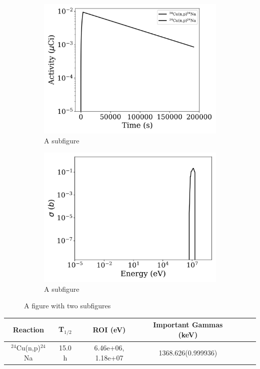 \begin{figure}[h]
\centering
\begin{subfigure}{.5\textwidth}
  \centering
     \includegraphics[width=.8\textwidth]{plot/Cu-24(n,p)Na-24_library1} 

  \caption{A subfigure}
  \label{fig:sub1}
\end{subfigure}%
\begin{subfigure}{.5\textwidth}
  \centering
     \includegraphics[width=.8\textwidth]{plot/Cu-24(n,p)Na-24} 

  \caption{A subfigure}
  \label{fig:sub2}
\end{subfigure}
\caption{A figure with two subfigures}
\label{fig:test}
\end{figure}

\begin{table}[h]
\centering
\begin{tabular}{ |c|c|c|c|c|c|c| }
 \hline
 Reaction & T$_{1/2}$ & ROI (eV) & Important Gammas (keV) \\
 \hline 
 $^{24}$Cu(n,p)$^{24}$Na & 15.0 h & 6.46e+06, 1.18e+07 & 1368.626(0.999936) \\ 
\hline
\end{tabular}
\end{table}
